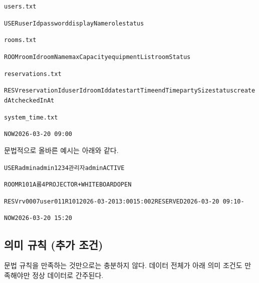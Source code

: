 \documentclass[a4paper,10pt]{article}
\newcommand{\softsep}{\textbar}
\begin{document}
\begin{menubox}
\small
\texttt{users.txt}\par
\texttt{USER\softsep{}userId\softsep{}password\softsep{}displayName\softsep{}role\softsep{}status}\par\medskip
\texttt{rooms.txt}\par
\texttt{ROOM\softsep{}roomId\softsep{}roomName\softsep{}maxCapacity\softsep{}equipmentList\softsep{}roomStatus}\par\medskip
\texttt{reservations.txt}\par
\texttt{RESV\softsep{}reservationId\softsep{}userId\softsep{}roomId\softsep{}date\softsep{}startTime\softsep{}endTime\softsep{}partySize\softsep{}status\softsep{}createdAt\softsep{}checkedInAt}\par\medskip
\texttt{system\_time.txt}\par
\texttt{NOW\softsep{}2026-03-20 09:00}
\end{menubox}

문법적으로 올바른 예시는 아래와 같다.

\begin{menubox}
\small
\texttt{USER\softsep{}admin\softsep{}admin1234\softsep{}관리자\softsep{}admin\softsep{}ACTIVE}\par
\texttt{ROOM\softsep{}R101\softsep{}A룸\softsep{}4\softsep{}PROJECTOR+WHITEBOARD\softsep{}OPEN}\par
\texttt{RESV\softsep{}rv0007\softsep{}user011\softsep{}R101\softsep{}2026-03-20\softsep{}13:00\softsep{}15:00\softsep{}2\softsep{}RESERVED\softsep{}2026-03-20 09:10\softsep{}-}\par
\texttt{NOW\softsep{}2026-03-20 15:20}
\end{menubox}

\subsection{의미 규칙 (추가 조건)}
문법 규칙을 만족하는 것만으로는 충분하지 않다. 데이터 전체가 아래 의미 조건도 만족해야만 정상 데이터로 간주된다.
\end{document}
